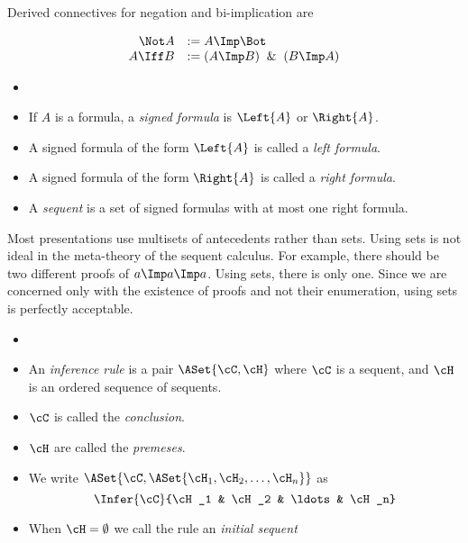 \begin{definition}
  Derived connectives for negation and bi-implication are

  \[
  \begin{array}{rl}
    \Not A &:= A \Imp \Bot \\
    A \Iff B &:= (A \Imp B) \And (B \Imp A)
  \end{array}
  \]
\end{definition}

\begin{definition}[Sequents]
  \begin{itemize}
  \item[]
  \item If $A$ is a formula, a \emph{signed formula} is
    $\Left{A}$ or $\Right{A}$.
  \item A signed formula of the form $\Left{A}$ is called a \emph{left formula}.
  \item A signed formula of the form $\Right{A}$ is called a \emph{right formula}.
  \item A \emph{sequent} is a set of signed formulas
    with at most one right formula.
  \end{itemize}
\end{definition}

\begin{remark}
  Most presentations use multisets of antecedents rather than sets.  Using sets
  is not ideal in the meta-theory of the sequent calculus.  For example, there
  should be two different proofs of $a\Imp a\Imp a$.  Using sets, there is only
  one.  Since we are concerned only with the existence of proofs and not their
  enumeration, using sets is perfectly acceptable.
\end{remark}

\begin{definition}
  \begin{itemize}
    \item[]
    \item An \emph{inference rule} is a pair $\ASet{\cC, \cH}$
      where $\cC$ is
      a sequent, and $\cH$ is an ordered sequence of sequents.
    \item $\cC$ is called the \emph{conclusion}.
    \item $\cH$ are called the \emph{premeses}.
    \item We write $\ASet{\cC, \ASet{\cH_1, \cH_2,\ldots,\cH_n}}$ as
      \[
      \Infer{\cC}{\cH_1 & \cH_2 & \ldots & \cH_n}
      \]
    \item When $\cH=\emptyset$ we call the rule
      an \emph{initial sequent}
    \end{itemize}
\end{definition}

